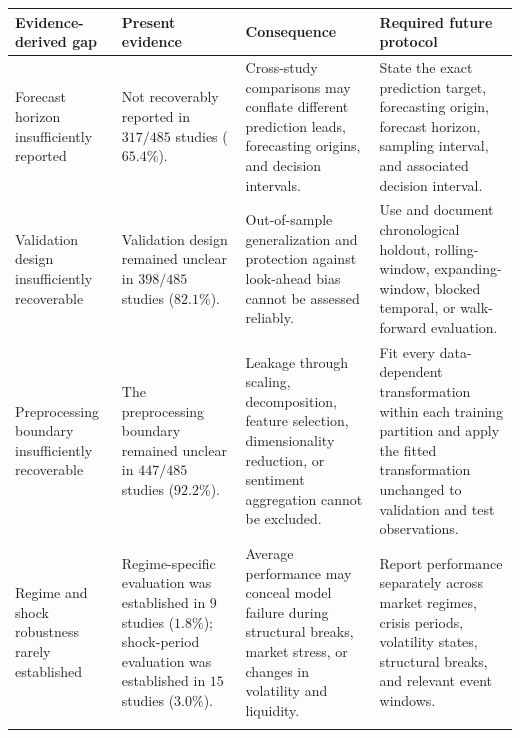 \documentclass[pdflatex,sn-mathphys-num]{sn-jnl}%
\theoremstyle{thmstyleone}%
\theoremstyle{thmstyletwo}%
\theoremstyle{thmstylethree}%
\begin{document}
\begin{landscape}

\centering
\begin{minipage}{0.98\linewidth}

\label{tab:evidence-action-roadmap}

\footnotesize
\setlength{\tabcolsep}{4pt}
\renewcommand{\arraystretch}{1.13}

\begin{tabularx}{\linewidth}{
@{}
>{\hsize=0.78\hsize\RaggedRight\arraybackslash}X
>{\hsize=0.82\hsize\RaggedRight\arraybackslash}X
>{\hsize=1.05\hsize\RaggedRight\arraybackslash}X
>{\hsize=1.35\hsize\RaggedRight\arraybackslash}X
@{}
}
\toprule

\textbf{Evidence-derived gap}
&
\textbf{Present evidence}
&
\textbf{Consequence}
&
\textbf{Required future protocol}
\\
\midrule

Forecast horizon insufficiently reported
&
Not recoverably reported in \(317/485\) studies (\(65.4\%\)).
&
Cross-study comparisons may conflate different prediction leads,
forecasting origins, and decision intervals.
&
State the exact prediction target, forecasting origin, forecast horizon,
sampling interval, and associated decision interval.
\\
\addlinespace[2.5pt]

Validation design insufficiently recoverable
&
Validation design remained unclear in \(398/485\) studies
(\(82.1\%\)).
&
Out-of-sample generalization and protection against look-ahead bias
cannot be assessed reliably.
&
Use and document chronological holdout, rolling-window,
expanding-window, blocked temporal, or walk-forward evaluation.
\\
\addlinespace[2.5pt]

Preprocessing boundary insufficiently recoverable
&
The preprocessing boundary remained unclear in \(447/485\) studies
(\(92.2\%\)).
&
Leakage through scaling, decomposition, feature selection,
dimensionality reduction, or sentiment aggregation cannot be excluded.
&
Fit every data-dependent transformation within each training
partition and apply the fitted transformation unchanged to validation
and test observations.
\\
\addlinespace[2.5pt]

Regime and shock robustness rarely established
&
Regime-specific evaluation was established in \(9\) studies
(\(1.8\%\)); shock-period evaluation was established in \(15\) studies
(\(3.0\%\)).
&
Average performance may conceal model failure during structural breaks,
market stress, or changes in volatility and liquidity.
&
Report performance separately across market regimes, crisis periods,
volatility states, structural breaks, and relevant event windows.
\\
\addlinespace[2.5pt]


\end{tabularx}
\end{minipage}
\end{landscape}
\end{document}

